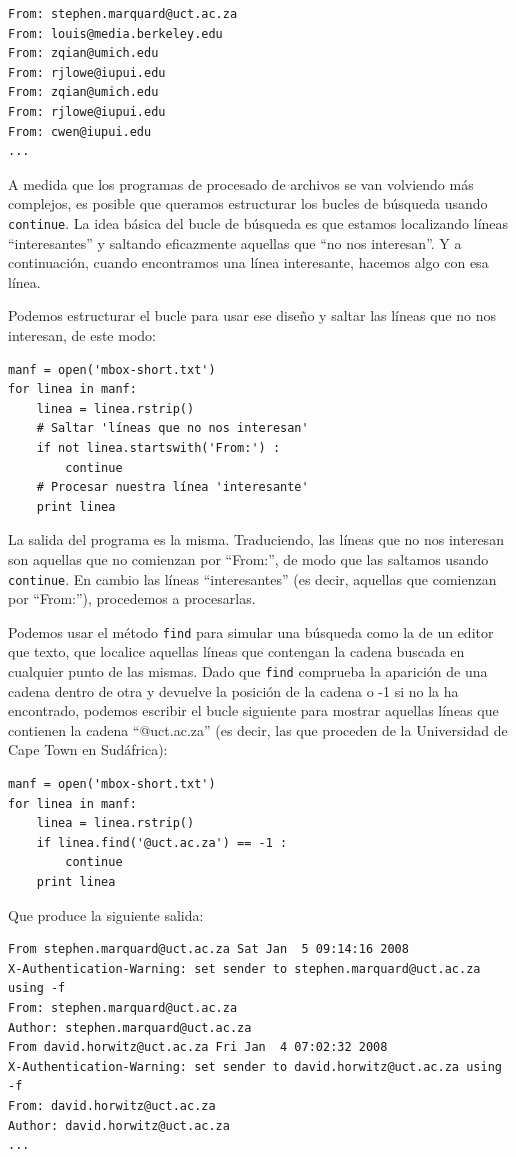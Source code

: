 \beforeverb
\begin{verbatim}
From: stephen.marquard@uct.ac.za
From: louis@media.berkeley.edu
From: zqian@umich.edu
From: rjlowe@iupui.edu
From: zqian@umich.edu
From: rjlowe@iupui.edu
From: cwen@iupui.edu
...
\end{verbatim}
\afterverb
%
A medida que los programas de procesado de archivos se van volviendo más complejos, es posible
que queramos estructurar los bucles de búsqueda usando {\tt continue}. La idea básica
del bucle de búsqueda es que estamos localizando líneas ``interesantes''
y saltando eficazmente aquellas que ``no nos interesan''. Y a continuación, cuando
encontramos una línea interesante, hacemos algo con esa línea.

Podemos estructurar el bucle para usar ese
diseño y saltar las líneas que no nos interesan, de este modo:

\beforeverb
\begin{verbatim}
manf = open('mbox-short.txt')
for linea in manf:
    linea = linea.rstrip()
    # Saltar 'líneas que no nos interesan'
    if not linea.startswith('From:') :
        continue
    # Procesar nuestra línea 'interesante'
    print linea
\end{verbatim}
\afterverb
%
La salida del programa es la misma. Traduciendo, las
líneas que no nos interesan son aquellas que no comienzan
por ``From:'', de modo que las saltamos usando {\tt continue}.
En cambio las líneas ``interesantes'' (es decir, aquellas que comienzan por ``From:''),
procedemos a procesarlas.

Podemos usar el método {\tt find} para simular una búsqueda como la de
un editor que texto, que localice aquellas líneas que contengan la cadena buscada
en cualquier punto de las mismas.
Dado que {\tt find} comprueba la aparición de una cadena dentro de otra
y devuelve la posición de la cadena o -1 si no la ha encontrado,
podemos escribir el bucle siguiente para mostrar aquellas líneas
que contienen la cadena ``@uct.ac.za'' (es decir, las que proceden de la Universidad
de Cape Town en Sudáfrica):

\beforeverb
\begin{verbatim}
manf = open('mbox-short.txt')
for linea in manf:
    linea = linea.rstrip()
    if linea.find('@uct.ac.za') == -1 : 
        continue
    print linea
\end{verbatim}
\afterverb
%
Que produce la siguiente salida:

\beforeverb
\begin{verbatim}
From stephen.marquard@uct.ac.za Sat Jan  5 09:14:16 2008
X-Authentication-Warning: set sender to stephen.marquard@uct.ac.za using -f
From: stephen.marquard@uct.ac.za
Author: stephen.marquard@uct.ac.za
From david.horwitz@uct.ac.za Fri Jan  4 07:02:32 2008
X-Authentication-Warning: set sender to david.horwitz@uct.ac.za using -f
From: david.horwitz@uct.ac.za
Author: david.horwitz@uct.ac.za
...
\end{verbatim}
\afterverb
%

